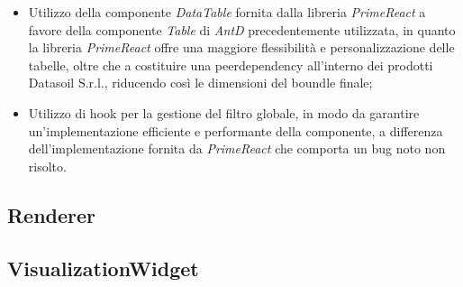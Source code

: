 \begin{itemize}
\begin{itemize}
                  \item Utilizzo della componente \textit{DataTable} fornita dalla libreria \textit{PrimeReact} a favore della componente \textit{Table} di \textit{AntD} precedentemente utilizzata,
                        in quanto la libreria \textit{PrimeReact} offre una maggiore flessibilità e personalizzazione delle tabelle, oltre che a costituire una peerdependency all'interno dei
                        prodotti Datasoil S.r.l., riducendo così le dimensioni del boundle finale;
                  \item Utilizzo di hook per la gestione del filtro globale, in modo da garantire un'implementazione efficiente e performante della componente, a differenza dell'implementazione
                        fornita da \textit{PrimeReact} che comporta un bug noto non risolto.
            \end{itemize}
\end{itemize}

\subsection{Renderer}

\subsection{VisualizationWidget}
